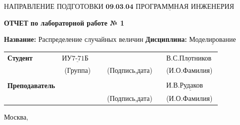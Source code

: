 \documentclass[12pt,a4paper,oneside]{report}
\begin{document}
\noindent НАПРАВЛЕНИЕ ПОДГОТОВКИ $\underline{\textbf{09.03.04 ПРОГРАММНАЯ ИНЖЕНЕРИЯ}}$\newline\newline\newline\newline\newline\newline\newline
\begin{center}
    \begin{flushright}
    \Large\textbf{ОТЧЕТ}\newline
	\Large\textbf{по лабораторной работе № 1}\newline
	\end{flushright}
\end{center}
\noindent\textbf{Название:} $\underline{\text{Распределение случайных величин}}$\newline\newline
\noindent\textbf{Дисциплина:} $\underline{\text{Моделирование}}$\newline\newline\newline\newline\newline\newline\newline\newline
\begin{tabular}{lcp{5em}lp{2em}l}
	\noindent\textbf{Студент} &  $\underline{\text{ИУ7-71Б~~}}$ &             &\hspace{1cm} & & $\underline{\text{В.С.Плотников}}$ \\\cline{4-3}
	 & (Группа) & &(Подпись,дата)  & & (И.О.Фамилия) \\
	 & & & & &\\
	\noindent\textbf{Преподаватель} &  & &\hspace{1cm} & &$\underline{\text{И.В.Рудаков ~~~~}}$ \\\cline{4-3} 
	 &  & & (Подпись,дата)  & &(И.О.Фамилия) \\
    \end{tabular}
\begin{center}
	\vfill
	Москва, \the\year
\end{center}
\clearpage

\end{document}
